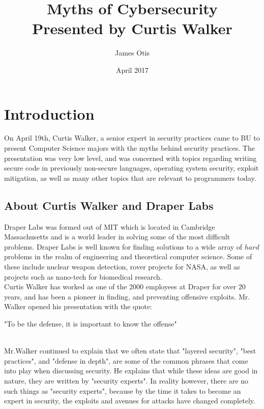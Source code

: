 \documentclass{article}
\title{Myths of Cybersecurity \\ Presented by Curtis Walker}
\author{James Otis }
\date{April 2017}
\newcommand\tab[1][1cm]{\hspace*{#1}}
\begin{document}
\maketitle
\section{Introduction}
\tab On April 19th, Curtis Walker, a senior expert in security practices came to BU to present Computer Science majors with the myths behind security practices. The presentation was very low level, and was concerned with topics regarding writing secure code in previously non-secure languages, operating system security, exploit mitigation, as well as many other topics that are relevant to programmers today.

\subsection{About Curtis Walker and Draper Labs}
\tab  Draper Labs was formed out of MIT which is located in Cambridge Massachusetts and is a world leader in solving some of the most difficult problems. Draper Labs is well known for finding solutions to a wide array of $hard$ problems in the realm of engineering and theoretical computer science. Some of these include nuclear weapon detection, rover projects for NASA, as well as projects such as nano-tech for biomedical research.
\\
\tab Curtis Walker has worked as one of the 2000 employees at Draper for over 20 years, and has been a pioneer in finding, and preventing offensive exploits. Mr. Walker opened his presentation with the quote:
\\
\begin{center}
"To be the defense, it is important to know the offense"
\end{center}
\\
\tab Mr.Walker continued to explain that we often state that "layered security", "best practices", and "defense in depth", are some of the common phrases that come into play when discussing security. He explains that while these ideas are good in nature, they are written by "security experts". In reality however, there are no such things as "security experts", because by the time it takes to become an expert in security, the exploits and avenues for attacks have changed completely. 
\end{document}
